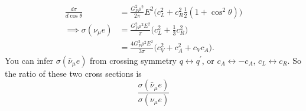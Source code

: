 \documentclass[a4paper,12pt]{article}
\begin{document}
\begin{equation}
\begin{split}
\frac{d\sigma}{d\cos\theta} &= \frac{G_F^2 \rho^2}{2 \pi} E^2 \big(c_L^2 + c_R^2\frac{1}{2}(1 + \cos^2\theta)\big) \\
\implies \sigma(\nu_\mu e) &= \frac{G_F^2 \rho^2 E^2}{\pi} \big(c_L^2 + \frac{1}{3}c_R^2\big) \\
&= \frac{4G_F^2 \rho^2E^2}{3 \pi}\big(c_V^2 + c_A^2 + c_V c_A\big).
\end{split}
\end{equation}
You can infer $\sigma(\bar{\nu}_\mu e)$ from crossing symmetry $q \leftrightarrow q^\prime$, or $c_A \leftrightarrow -c_A$, $c_L \leftrightarrow c_R$. So the ratio of these two cross sections is
\begin{equation}
\frac{\sigma(\bar{\nu}_\mu e)}{\sigma(\nu_\mu e)}
\end{equation}
\end{document}
